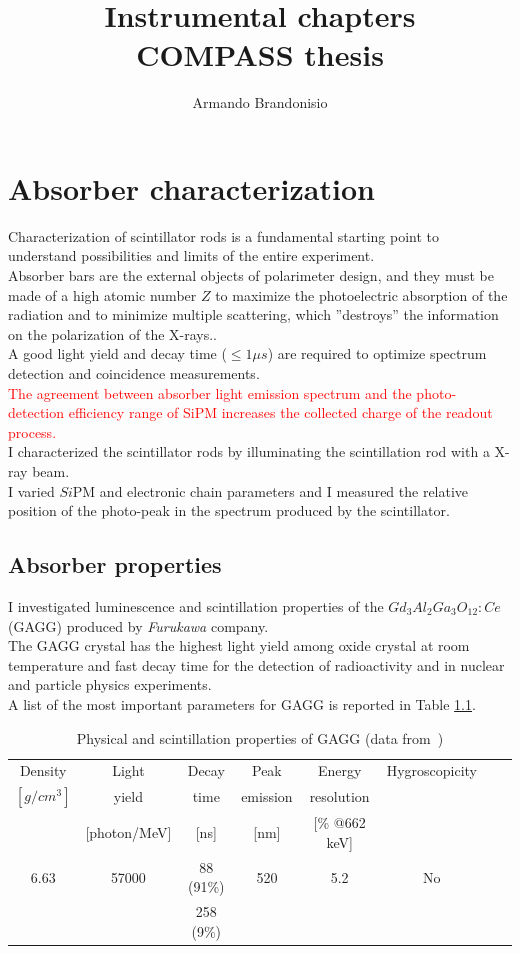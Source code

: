 \documentclass[10pt,a4paper, openany]{book}
\author{Armando Brandonisio}
\title{\textbf{Instrumental chapters}\\COMPASS thesis}
\begin{document}
\maketitle
\tableofcontents \newpage


\chapter{Absorber characterization}

Characterization of scintillator rods is a fundamental starting point to understand possibilities and limits of the entire experiment.\\
Absorber bars are the external objects of polarimeter design, and they must be made of a high atomic number $Z$ to maximize the photoelectric absorption of the radiation and to minimize multiple scattering, which ''destroys'' the information on the polarization of the X-rays..\\
A good light yield and decay time ($\leq 1\mu s$) are required to optimize spectrum detection and coincidence measurements.\\
\textcolor{red}{The agreement between absorber light emission spectrum and the photo-detection efficiency range of SiPM increases the collected charge of the readout process.}\\
I characterized the scintillator rods by illuminating the scintillation rod with a X-ray beam.\\
I varied $Si$PM and electronic chain parameters and I measured the relative position of the photo-peak in the spectrum produced by the scintillator.


\section{Absorber properties}
I investigated luminescence and scintillation properties of the $Gd_3 Al_2 Ga_3 O_{12} : Ce$ (GAGG) produced by \emph{Furukawa} company.\\
The GAGG crystal has the highest light yield among oxide crystal at room temperature \cite{abs:1} and fast decay time for the detection of radioactivity and in nuclear and particle physics experiments.\\
A list of the most important parameters for GAGG is reported in Table \ref{tab:abs1}.

\begin{table}[h]
\begin{tabular}{cccccccc}
\toprule
Density & Light & Decay & Peak & Energy & Hygroscopicity  \\
 $[g/cm^3]$ & yield & time & emission & resolution &   \\
   & [photon/MeV] & [ns] & [nm] & [\% @662 keV] &   \\
\midrule
6.63 & 57000 & 88 (91\%) & 520 & 5.2  & No\\
 & & 258 (9\%) & & & \\
\bottomrule
\end{tabular}
\caption{Physical and scintillation properties of GAGG (data from~\cite{gagg:1})} \label{tab:abs1}
\end{table}
\end{document}
